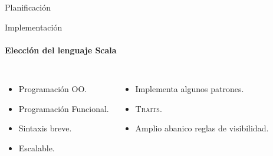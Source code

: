 \documentclass[utf8,draft]{beamer}
\begin{document}
\begin{frame}{Planificación}
{}
\end{frame}

\begin{frame}{Implementación}
  \framesubtitle{Elección del lenguaje Scala}
  \begin{columns}[onlytextwidth,c]
    \begin{itemize}
    \item Programación OO.
    \item Programación Funcional.
    \item Sintaxis breve.
    \item Escalable.
    \end{itemize}
    \begin{itemize}
    \item Implementa algunos patrones.
    \item \textsc{Traits}.
    \item Amplio abanico reglas de visibilidad.
    \end{itemize}
  \end{columns}
\end{frame}
\end{document}
